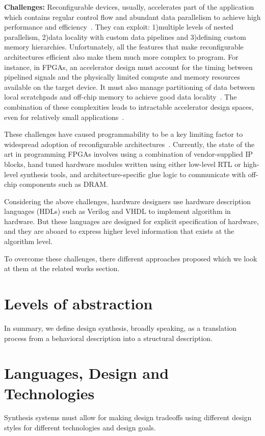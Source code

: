 \textbf{Challenges:}
Reconfigurable devices, usually, accelerates part of the application which contains regular control flow and abundant data parallelism to achieve high performance and efficiency~\cite{spatial_computation, trips, govindaraju_hpca_2011}.
They can exploit: 1)multiple levels of nested parallelism, 2)data locality with custom data pipelines and 3)defining custom memory hierarchies.
Unfortunately, all the features that make reconfigurable architectures efficient also make them much more complex to program.
For instance, in FPGAs, an accelerator design must account for the timing between pipelined signals and the physically limited compute and memory resources available on the target device.
It must also manage partitioning of data between local scratchpads and off-chip memory to achieve good data locality~\cite{gzip_2013_fpga}.
The combination of these complexities leads to intractable accelerator design spaces, even for relatively small applications~\cite{cascaval_taxonomy_accelerator}.

These challenges have caused programmability to be a key limiting factor to widespread adoption of reconfigurable architectures~\cite{fpga_masses, cgra_architecture}.
Currently, the state of the art in programming FPGAs involves using a combination of vendor-supplied IP blocks, hand tuned hardware modules written using either low-level RTL or high-level synthesis tools, and architecture-specific glue logic to communicate with off-chip components such as DRAM.

Considering the above challenges, hardware designers use hardware description languages (HDLs) such as Verilog and VHDL to implement algorithm in hardware.
But these languages are designed for explicit specification of hardware, and they are aboard to express higher level information that exists at the algorithm level.

To overcome these challenges, there different approaches proposed which we look at them at the related works section.


\section{Levels of abstraction}

In summary, we define design synthesis, broadly speaking, as a translation process from a behavioral description into a structural description.

\section{Languages, Design and Technologies}
Synthesis systems must allow for making design tradeoffs using different design styles for different technologies and design goals.

